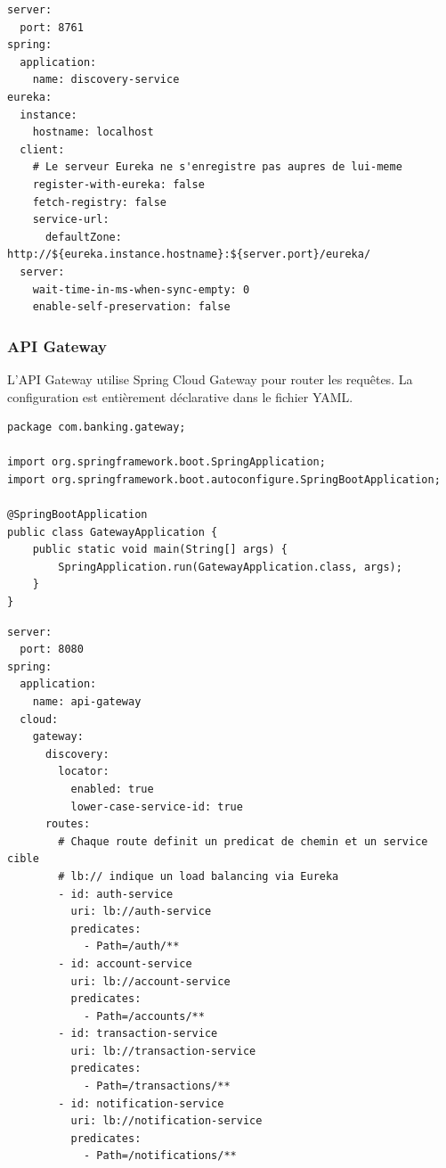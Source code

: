 \documentclass[12pt,a4paper]{article}
\begin{document}
\begin{lstlisting}[style=ymlstyle, caption={application.yml du discovery-service}, label=lst:discovery_yml]
server:
  port: 8761
spring:
  application:
    name: discovery-service
eureka:
  instance:
    hostname: localhost
  client:
    # Le serveur Eureka ne s'enregistre pas aupres de lui-meme
    register-with-eureka: false
    fetch-registry: false
    service-url:
      defaultZone: http://${eureka.instance.hostname}:${server.port}/eureka/
  server:
    wait-time-in-ms-when-sync-empty: 0
    enable-self-preservation: false
\end{lstlisting}

\subsubsection{API Gateway}

L'API Gateway utilise Spring Cloud Gateway pour router les requêtes. La configuration est entièrement déclarative dans le fichier YAML.

\begin{lstlisting}[style=javastyle, caption={GatewayApplication.java}, label=lst:gateway]
package com.banking.gateway;

import org.springframework.boot.SpringApplication;
import org.springframework.boot.autoconfigure.SpringBootApplication;

@SpringBootApplication
public class GatewayApplication {
    public static void main(String[] args) {
        SpringApplication.run(GatewayApplication.class, args);
    }
}
\end{lstlisting}

\begin{lstlisting}[style=ymlstyle, caption={application.yml de l'API Gateway --- Configuration du routage}, label=lst:gateway_yml]
server:
  port: 8080
spring:
  application:
    name: api-gateway
  cloud:
    gateway:
      discovery:
        locator:
          enabled: true
          lower-case-service-id: true
      routes:
        # Chaque route definit un predicat de chemin et un service cible
        # lb:// indique un load balancing via Eureka
        - id: auth-service
          uri: lb://auth-service
          predicates:
            - Path=/auth/**
        - id: account-service
          uri: lb://account-service
          predicates:
            - Path=/accounts/**
        - id: transaction-service
          uri: lb://transaction-service
          predicates:
            - Path=/transactions/**
        - id: notification-service
          uri: lb://notification-service
          predicates:
            - Path=/notifications/**
\end{lstlisting}
\end{document}
